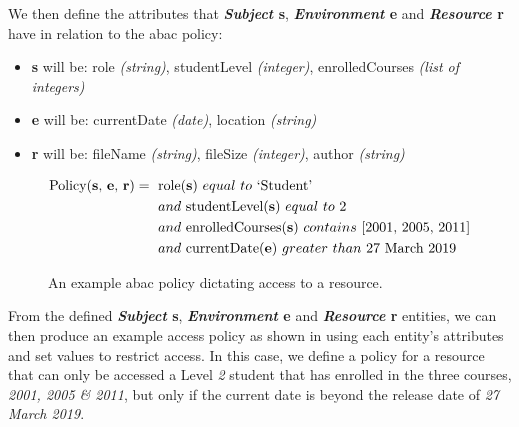 We then define the attributes that \textbf{\textit{Subject} s}, \textbf{\textit{Environment} e} and \textbf{\textit{Resource} r} have in relation to the \acrshort{abac} policy:
\begin{itemize}
  \item[]
    \textbf{s} will be: role \textit{(string)}, studentLevel \textit{(integer)}, enrolledCourses \textit{(list of integers)}
  \item[]
    \textbf{e} will be: currentDate \textit{(date)}, location \textit{(string)}
  \item[]
    \textbf{r} will be: fileName \textit{(string)}, fileSize \textit{(integer)}, author \textit{(string)}
\end{itemize}

\begin{figure}[ht]
  \centering
\begin{align*}
  \text{Policy(\textbf{s}, \textbf{e}, \textbf{r})}
  &
    =
    \text{ role(\textbf{s}) } equal \text{ } to \text{ `Student'}
  \\
  &
    \phantom{::::::} and
    \text{ studentLevel(\textbf{s}) } equal \text{ } to \text{ 2}
  \\
  &
    \phantom{::::::} and
    \text{ enrolledCourses(\textbf{s}) } contains \text{ [2001, 2005, 2011]}
  \\
  &
    \phantom{::::::} and
    \text{ currentDate(\textbf{e}) } greater \text{ } than \text{ 27 March 2019}
\end{align*}
  \caption{
    \label{fig:bkgr_abac_policy}
    An example \acrshort{abac} policy dictating access to a resource.
  }
\end{figure}

From the defined \textbf{\textit{Subject} s}, \textbf{\textit{Environment} e} and \textbf{\textit{Resource} r} entities, we can then produce an example access policy as shown in  using each entity's attributes and set values to restrict access. In this case, we define a policy for a resource that can only be accessed a Level \textit{2} student that has enrolled in the three courses, \textit{2001, 2005 \& 2011}, but only if the current date is beyond the release date of \textit{27 March 2019}.
